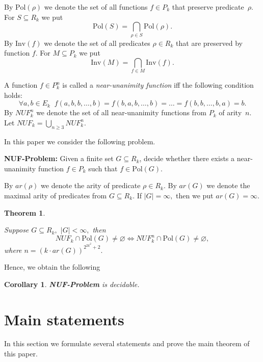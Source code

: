 \documentclass{au}
\theoremstyle{plain}
\newtheorem{theorem}{Theorem}
\newtheorem{corollary}{Corollary}
\theoremstyle{definition}
\theoremstyle{remark}
\numberwithin{equation}{section}
\begin{document}
By ${
\mathrm{Pol}
}(\rho)$ we denote the set of all functions $f\in P_{k}$
that preserve predicate~$\rho.$ For $S\subseteq R_{k}$ we put
$${
\mathrm{Pol}
}(S) = \bigcap \limits_{\rho\in S} {
\mathrm{Pol}
} (\rho).$$
By ${
\mathrm{Inv}
}(f)$ we denote the set of all predicates $\rho\in R_{k}$
that are preserved by function $f.$ For $M\subseteq P_{k}$ we put
$${
\mathrm{Inv}
}(M) = \bigcap \limits_{f\in M} {
\mathrm{Inv}
} (f).$$

A function $f\in P_{k}^{n}$ is called a \emph{near-unanimity function}
iff the following condition holds:
$$\forall a,b \in E_{k} \;\; f(a,b,b,\ldots,b) =
f(b,a,b,\ldots,b) = \ldots = f(b,b,\ldots,b, a) = b.$$
By $NUF_{k}^{n}$ we denote the set of all near-unanimity functions from $P_{k}$ of arity~$n.$
Let $NUF_{k} = \bigcup \limits_{n\ge 3} NUF_{k}^{n}.$

In this paper we consider the following problem.

\textbf{NUF-Problem:} Given a finite set $G\subseteq R_{k}$, decide whether there exists a
near-unanimity function $f\in P_{k}$ such that $f\in {
\mathrm{Pol}
}(G).$

By $ar(\rho)$ we denote the arity of predicate $\rho\in R_{k}.$
By $ar(G)$ we denote the maximal arity of predicates from $G\subseteq R_{k}.$
If $|G| = \infty,$ then we put $ar(G) = \infty.$

\begin{theorem}\label{maintheorem}

Suppose $G\subseteq R_{k},$ $|G|<\infty,$
then 
$$NUF_{k}\cap {
\mathrm{Pol}
}(G) \neq \varnothing \Longleftrightarrow NUF_{k}^{n}\cap {
\mathrm{Pol}
}(G)\neq \varnothing,$$
where $n = (k \cdot ar(G))^{2^{2k^{2}}+2}.$

\end{theorem}

Hence, we obtain the following

\begin{corollary}

\textbf{NUF-Problem} is decidable.

\end{corollary}

\section{Main statements}

In this section we formulate several statements and prove the main theorem of this paper.
\end{document}
